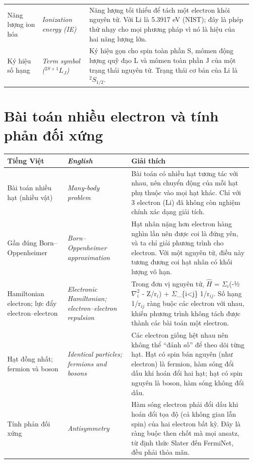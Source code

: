 \begin{longtable}{@{}>{\raggedright\arraybackslash}p{}>{\raggedright\arraybackslash\itshape}p{}>{\raggedright\arraybackslash}p{}@{}}
Năng lượng ion hóa & Ionization energy (IE) & Năng lượng tối thiểu để tách một electron khỏi nguyên tử. Với Li là 5.3917 eV (NIST); đây là phép thử nhạy cho mọi phương pháp vì nó là hiệu của hai năng lượng lớn. \\[2pt]
Ký hiệu số hạng & Term symbol ($^{2S+1}L_J$) & Ký hiệu gọn cho spin toàn phần S, mômen động lượng quỹ đạo L và mômen toàn phần J của một trạng thái nguyên tử. Trạng thái cơ bản của Li là $^2S_{1/2}$. \\[2pt]
\bottomrule\end{longtable}
\section*{Bài toán nhiều electron và tính phản đối xứng}
\begin{longtable}{@{}>{\raggedright\arraybackslash}p{}>{\raggedright\arraybackslash\itshape}p{}>{\raggedright\arraybackslash}p{}@{}}
\toprule \textbf{Tiếng Việt} & \textbf{\upshape English} & \textbf{Giải thích} \\ \midrule \endhead
Bài toán nhiều hạt (nhiều vật) & Many-body problem & Bài toán có nhiều hạt tương tác với nhau, nên chuyển động của mỗi hạt phụ thuộc vào mọi hạt khác. Chỉ với 3 electron (Li) đã không còn nghiệm chính xác dạng giải tích. \\[2pt]
Gần đúng Born–Oppenheimer & Born–Oppenheimer approximation & Hạt nhân nặng hơn electron hàng nghìn lần nên được coi là đứng yên, và ta chỉ giải phương trình cho electron. Với một nguyên tử, điều này tương đương coi hạt nhân có khối lượng vô hạn. \\[2pt]
Hamiltonian electron; lực đẩy electron–electron & Electronic Hamiltonian; electron–electron repulsion & Trong đơn vị nguyên tử, $\hat H$ = $\Sigma_{i}$(-½$\nabla_{i}^{2}$ - Z/r$_{i}$) + $\Sigma$\_\{i<j\} 1/r$_{ij}$. Số hạng 1/r$_{ij}$ ràng buộc các electron với nhau, khiến phương trình không tách được thành các bài toán một electron. \\[2pt]
Hạt đồng nhất; fermion và boson & Identical particles; fermions and bosons & Các electron giống hệt nhau nên không thể ``đánh số'' để theo dõi từng hạt. Hạt có spin bán nguyên (như electron) là fermion, hàm sóng đổi dấu khi hoán đổi hai hạt; hạt có spin nguyên là boson, hàm sóng không đổi dấu. \\[2pt]
Tính phản đối xứng & Antisymmetry & Hàm sóng electron phải đổi dấu khi hoán đổi tọa độ (cả không gian lẫn spin) của hai electron bất kỳ. Đây là ràng buộc then chốt mà mọi ansatz, từ định thức Slater đến FermiNet, đều phải thỏa mãn. \\[2pt]

\end{longtable}
